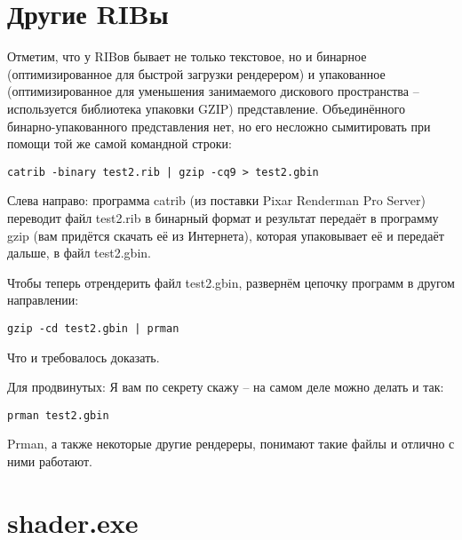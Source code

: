 \section*{Другие RIBы}

 Отметим, что у RIBов бывает не только текстовое, но
    и бинарное (оптимизированное для быстрой загрузки рендерером) и
    упакованное (оптимизированное для уменьшения занимаемого дискового
    пространства – используется библиотека упаковки GZIP)
    представление. Объединённого бинарно-упакованного представления
    нет, но его несложно сымитировать при помощи той же самой командной
    строки:
  
\begin{lstlisting}[frame=single, framerule=0pt, framesep=10pt, xleftmargin=10pt, xrightmargin=10pt, basicstyle=\ttfamily \small, backgroundcolor=\color{light-gray}]
catrib -binary test2.rib | gzip -cq9 > test2.gbin
\end{lstlisting}

 Слева направо: программа catrib (из поставки Pixar
    Renderman Pro Server) переводит файл test2.rib в бинарный формат и
    результат передаёт в программу gzip (вам придётся скачать её из
    Интернета), которая упаковывает её и передаёт дальше, в файл
    test2.gbin.
  

 Чтобы теперь отрендерить файл test2.gbin, развернём
    цепочку программ в другом направлении:
  
\begin{lstlisting}[frame=single, framerule=0pt, framesep=10pt, xleftmargin=10pt, xrightmargin=10pt, basicstyle=\ttfamily \small, backgroundcolor=\color{light-gray}]
gzip -cd test2.gbin | prman
\end{lstlisting}
  

 Что и требовалось доказать.
  

 Для
    продвинутых: Я вам по секрету скажу
    – на самом деле можно делать и так:
  
\begin{lstlisting}[frame=single, framerule=0pt, framesep=10pt, xleftmargin=10pt, xrightmargin=10pt, basicstyle=\ttfamily \small, backgroundcolor=\color{light-gray}]
prman test2.gbin
\end{lstlisting}
  

 Prman, а
    также некоторые другие рендереры, понимают такие файлы и отлично с
    ними работают.

  \section*{shader.exe}

